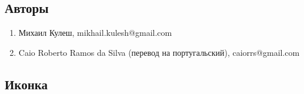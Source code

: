 \documentclass[DIV=calc, paper=a4, fontsize=11pt, twocolumn]{scrartcl}
\begin{document}
\subsection{Авторы}

\begin{enumerate}
\item Михаил Кулеш,
mikhail.kulesh@gmail.com

\item Caio Roberto Ramos da Silva
(перевод на португальский),
caiorrs@gmail.com
\end{enumerate}

\subsection{Иконка}
\end{document}
